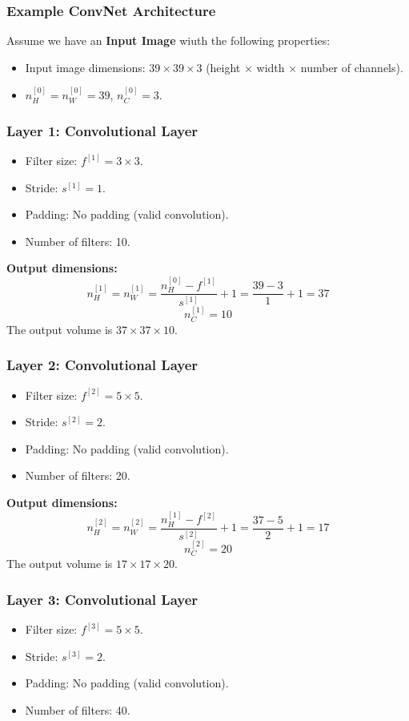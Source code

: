 \documentclass[letterpaper,12pt,notitlepage,twoside]{report}
\begin{document}
\subsubsection*{Example ConvNet Architecture}
Assume we have an \textbf{Input Image} wiuth the following properties:
\begin{itemize}[nosep]
    \item Input image dimensions: $39 \times 39 \times 3$ (height $\times$ width $\times$ number of channels).
    \item $n_H^{[0]} = n_W^{[0]} = 39$, $n_C^{[0]} = 3$.
\end{itemize}

\subsubsection*{Layer 1: Convolutional Layer}
\begin{itemize}[nosep]
    \item Filter size: $f^{[1]} = 3 \times 3$.
    \item Stride: $s^{[1]} = 1$.
    \item Padding: No padding (valid convolution).
    \item Number of filters: 10.
\end{itemize}

\textbf{Output dimensions:}
\[
n_H^{[1]} = n_W^{[1]} = \frac{n_H^{[0]} - f^{[1]}}{s^{[1]}} + 1 = \frac{39 - 3}{1} + 1 = 37
\]
\[
n_C^{[1]} = 10
\]
The output volume is $37 \times 37 \times 10$.

\subsubsection*{Layer 2: Convolutional Layer}
\begin{itemize}[nosep]
    \item Filter size: $f^{[2]} = 5 \times 5$.
    \item Stride: $s^{[2]} = 2$.
    \item Padding: No padding (valid convolution).
    \item Number of filters: 20.
\end{itemize}

\textbf{Output dimensions:}
\[
n_H^{[2]} = n_W^{[2]} = \frac{n_H^{[1]} - f^{[2]}}{s^{[2]}} + 1 = \frac{37 - 5}{2} + 1 = 17
\]
\[
n_C^{[2]} = 20
\]
The output volume is $17 \times 17 \times 20$.

\subsubsection*{Layer 3: Convolutional Layer}
\begin{itemize}[nosep]
    \item Filter size: $f^{[3]} = 5 \times 5$.
    \item Stride: $s^{[3]} = 2$.
    \item Padding: No padding (valid convolution).
    \item Number of filters: 40.
\end{itemize}
\end{document}
